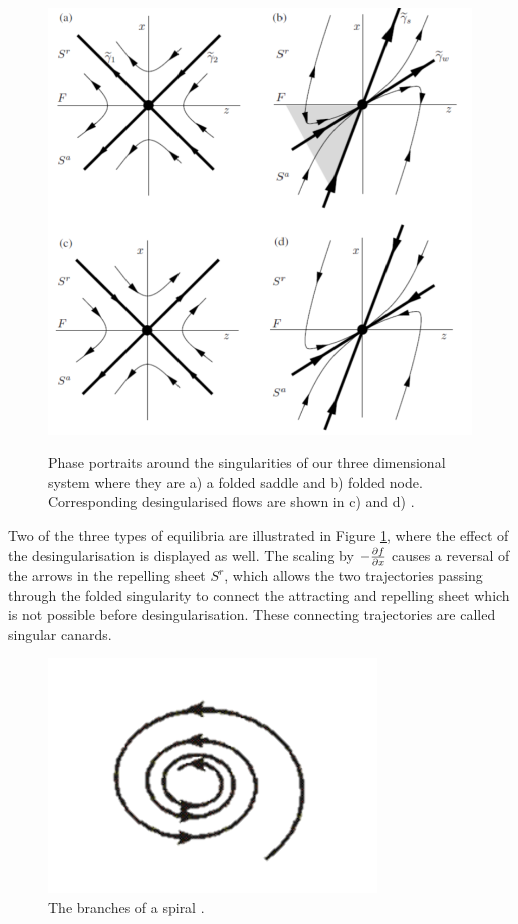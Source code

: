 \begin{figure}[h!]\centering
	\includegraphics[height=12cm,width=12cm]{Images/foldednodesetc}
	\caption[Phase portraits around singularities]{Phase portraits around the singularities of our three dimensional system where they are a) a folded saddle and b) folded node. Corresponding desingularised flows are shown in c) and d) \citep{MMO}.}
	\label{fig: folded singularities}
\end{figure}\newpage%
Two of the three types of equilibria are illustrated in Figure \ref{fig: folded singularities}, where the effect of the desingularisation is displayed as well. The scaling by $-\pd{f}{x}$
causes a reversal of the arrows in the repelling sheet $S^r$, which allows the two trajectories passing through the folded singularity to connect the attracting and repelling sheet which is not possible before desingularisation. These connecting trajectories are called singular canards.


\begin{figure}[h!]\centering
	\includegraphics{Images/spiral3}
	\caption{The branches of a spiral \citep{Spiral}.}
	\label{fig: spiral}
\end{figure}\newpage

